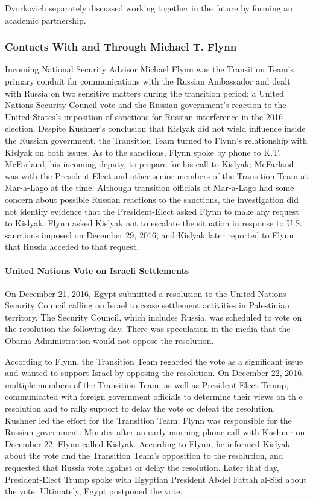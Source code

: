 Dvorkovich separately discussed working together in the future by forming an academic partnership.%

\subsubsection{Contacts With and Through Michael T. Flynn}

Incoming National Security Advisor Michael Flynn was the Transition Team's primary conduit for communications with the Russian Ambassador and dealt with Russia on two sensitive matters during the transition period: a United Nations Security Council vote and the Russian government's reaction to the United States's imposition of sanctions for Russian interference in the 2016 election.%
Despite Kushner's conclusion that Kislyak did not wield influence inside the Russian government, the Transition Team turned to Flynn's relationship with Kislyak on both issues.
As to the sanctions, Flynn spoke by phone to K.T. McFarland, his incoming deputy, to prepare for his call to Kislyak; McFarland was with the President-Elect and other senior members of the Transition Team at Mar-a-Lago at the time.
Although transition officials at Mar-a-Lago had some concern about possible Russian reactions to the sanctions, the investigation did not identify evidence that the President-Elect asked Flynn to make any request to Kislyak.
Flynn asked Kislyak not to escalate the situation in response to U.S. sanctions imposed on December 29, 2016, and Kislyak later reported to Flynn that Russia acceded to that request.

\paragraph{United Nations Vote on Israeli Settlements}

On December 21, 2016, Egypt submitted a resolution to the United Nations Security Council calling on Israel to cease settlement activities in Palestinian territory.%
The Security Council, which includes Russia, was scheduled to vote on the resolution the following day.%
There was speculation in the media that the Obama Administration would not oppose the resolution.%

According to Flynn, the Transition Team regarded the vote as a significant issue and wanted to support Israel by opposing the resolution.%
On December 22, 2016, multiple members of the Transition Team, as well as President-Elect Trump, communicated with foreign government officials to determine their views on th e resolution and to rally support to delay the vote or defeat the resolution.%
Kushner led the effort for the Transition Team; Flynn was responsible for the Russian government.%
Minutes after an early morning phone call with Kushner on December 22, Flynn called Kislyak.%
According to Flynn, he informed Kislyak about the vote and the Transition Team's opposition to the resolution, and requested that Russia vote against or delay the resolution.%
Later that day, President-Elect Trump spoke with Egyptian President Abdel Fattah al-Sisi about the vote.%
Ultimately, Egypt postponed the vote.%

